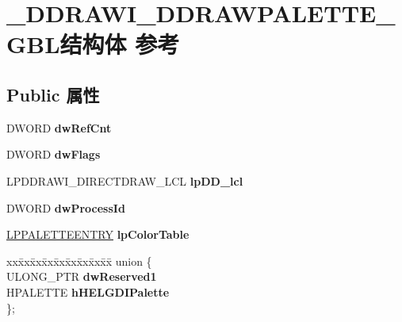 \hypertarget{struct___d_d_r_a_w_i___d_d_r_a_w_p_a_l_e_t_t_e___g_b_l}{}\section{\+\_\+\+D\+D\+R\+A\+W\+I\+\_\+\+D\+D\+R\+A\+W\+P\+A\+L\+E\+T\+T\+E\+\_\+\+G\+B\+L结构体 参考}
\label{struct___d_d_r_a_w_i___d_d_r_a_w_p_a_l_e_t_t_e___g_b_l}
\subsection*{Public 属性}
\begin{DoxyCompactItemize}
\item 
\mbox{\label{struct___d_d_r_a_w_i___d_d_r_a_w_p_a_l_e_t_t_e___g_b_l_aaf383d30ea46a86a0f2a49e7ccf71282}} 
D\+W\+O\+RD {\bfseries dw\+Ref\+Cnt}
\item 
\mbox{\label{struct___d_d_r_a_w_i___d_d_r_a_w_p_a_l_e_t_t_e___g_b_l_ae8694487f0ea25cc91e79a50882461c7}} 
D\+W\+O\+RD {\bfseries dw\+Flags}
\item 
\mbox{\label{struct___d_d_r_a_w_i___d_d_r_a_w_p_a_l_e_t_t_e___g_b_l_a54bc5567ae949d1116cd6141b8e1c2e9}} 
L\+P\+D\+D\+R\+A\+W\+I\+\_\+\+D\+I\+R\+E\+C\+T\+D\+R\+A\+W\+\_\+\+L\+CL {\bfseries lp\+D\+D\+\_\+lcl}
\item 
\mbox{\label{struct___d_d_r_a_w_i___d_d_r_a_w_p_a_l_e_t_t_e___g_b_l_aab16b84db812ce66b380f811be3719ae}} 
D\+W\+O\+RD {\bfseries dw\+Process\+Id}
\item 
\mbox{\label{struct___d_d_r_a_w_i___d_d_r_a_w_p_a_l_e_t_t_e___g_b_l_af5ccfb9893594809f02e1ea9dd841a52}} 
\hyperlink{structtag_p_a_l_e_t_t_e_e_n_t_r_y}{L\+P\+P\+A\+L\+E\+T\+T\+E\+E\+N\+T\+RY} {\bfseries lp\+Color\+Table}
\item 
\mbox{\label{struct___d_d_r_a_w_i___d_d_r_a_w_p_a_l_e_t_t_e___g_b_l_afd4659fa9700ab17a13b8f213e759d03}} 
\begin{tabbing}
xx\=xx\=xx\=xx\=xx\=xx\=xx\=xx\=xx\=\kill
union \{\\
\>ULONG\_PTR {\bfseries dwReserved1}\\
\>HPALETTE {\bfseries hHELGDIPalette}\\
\}; \\


\end{tabbing}
\end{DoxyCompactItemize}
